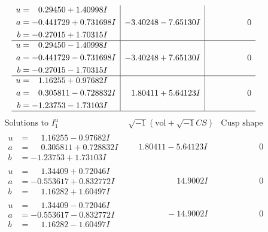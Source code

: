 \documentclass[1p]{elsarticle_modified}
\theoremstyle{definition}
\newcommand{\I}{\sqrt{-1}}
\begin{document}
$$\begin{array}{c|c|c}
\begin{aligned}
u &= \phantom{-}0.29450 + 1.40998 I \\
a &= -0.441729 + 0.731698 I \\
b &= -0.27015 + 1.70315 I\end{aligned}
 & -3.40248 - 7.65130 I & \phantom{-0.000000 } 0 \\ \hline\begin{aligned}
u &= \phantom{-}0.29450 - 1.40998 I \\
a &= -0.441729 - 0.731698 I \\
b &= -0.27015 - 1.70315 I\end{aligned}
 & -3.40248 + 7.65130 I & \phantom{-0.000000 } 0 \\ \hline\begin{aligned}
u &= \phantom{-}1.16255 + 0.97682 I \\
a &= \phantom{-}0.305811 - 0.728832 I \\
b &= -1.23753 - 1.73103 I\end{aligned}
 & \phantom{-}1.80411 + 5.64123 I & \phantom{-0.000000 } 0\\
 \hline 
 \end{array}$$\newpage$$\begin{array}{c|c|c}  
\text{Solutions to }I^u_{1}& \I (\text{vol} + \sqrt{-1}CS) & \text{Cusp shape}\\
 \hline 
\begin{aligned}
u &= \phantom{-}1.16255 - 0.97682 I \\
a &= \phantom{-}0.305811 + 0.728832 I \\
b &= -1.23753 + 1.73103 I\end{aligned}
 & \phantom{-}1.80411 - 5.64123 I & \phantom{-0.000000 } 0 \\ \hline\begin{aligned}
u &= \phantom{-}1.34409 + 0.72046 I \\
a &= -0.553617 + 0.832772 I \\
b &= \phantom{-}1.16282 + 1.60497 I\end{aligned}
 & \phantom{-0.000000 -}14.9002 I & \phantom{-0.000000 } 0 \\ \hline\begin{aligned}
u &= \phantom{-}1.34409 - 0.72046 I \\
a &= -0.553617 - 0.832772 I \\
b &= \phantom{-}1.16282 - 1.60497 I\end{aligned}
 & \phantom{-0.000000 } -14.9002 I & \phantom{-0.000000 } 0 \\ \hline\begin{aligned}

\end{aligned}
\end{array}$$
\end{document}
